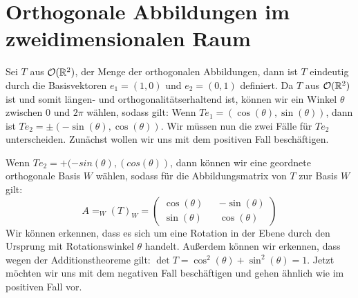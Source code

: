 \section{Orthogonale Abbildungen im zweidimensionalen Raum}
Sei $T$ aus ${\mathcal{O}(\mathbb{R}^2)}$, der Menge der orthogonalen Abbildungen, dann ist $T$ eindeutig durch die Basisvektoren $e_1 = (1,0)$ und $e_2 = (0,1)$ definiert. Da $T$ aus ${\mathcal{O}(\mathbb{R}^2)}$ ist und somit längen- und orthogonalitätserhaltend ist, können wir ein Winkel $\theta$ zwischen $0$ und $2 \pi$ wählen, sodass gilt: Wenn $Te_1 = (\cos(\theta),\sin(\theta))$, dann ist $Te_2 = \pm (-\sin(\theta),\cos(\theta))$.
Wir müssen nun die zwei Fälle für $Te_2$ unterscheiden. Zunächst wollen wir uns mit dem positiven Fall beschäftigen. 

Wenn $Te_2 = + (-sin(\theta),(cos(\theta))$, dann können wir eine geordnete orthogonale Basis $W$ wählen, sodass für die Abbildungsmatrix von $T$ zur Basis $W$ gilt:
$$A = _W(T)_W = \begin{pmatrix}
	\cos(\theta) && -\sin(\theta) \\
	\sin(\theta) && \cos(\theta)
\end{pmatrix} $$
Wir können erkennen, dass es sich um eine Rotation in der Ebene durch den Ursprung mit Rotationswinkel $\theta$ handelt. Außerdem können wir erkennen, dass wegen der Additionstheoreme gilt: $\det T = \cos^2(\theta) + \sin^2(\theta) = 1$.
Jetzt möchten wir uns mit dem negativen Fall beschäftigen und gehen ähnlich wie im positiven Fall vor.


